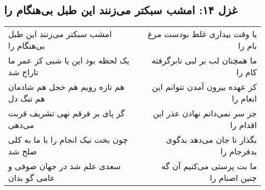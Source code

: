 \begin{center}
\section*{غزل ۱۴: امشب سبکتر می‌زنند این طبل بی‌هنگام را}
\label{sec:014}
\begin{longtable}{l p{0.5cm} r}
امشب سبکتر می‌زنند این طبل بی‌هنگام را
&&
یا وقت بیداری غلط بودست مرغ بام را
\\
یک لحظه بود این یا شبی کز عمر ما تاراج شد
&&
ما همچنان لب بر لبی نابرگرفته کام را
\\
هم تازه رویم هم خجل هم شادمان هم تنگ دل
&&
کز عهده بیرون آمدن نتوانم این انعام را
\\
گر پای بر فرقم نهی تشریف قربت می‌دهی
&&
جز سر نمی‌دانم نهادن عذر این اقدام را
\\
چون بخت نیک انجام را با ما به کلی صلح شد
&&
بگذار تا جان می‌دهد بدگوی بدفرجام را
\\
سعدی علم شد در جهان صوفی و عامی گو بدان
&&
ما بت پرستی می‌کنیم آن گه چنین اصنام را
\\
\end{longtable}
\end{center}
